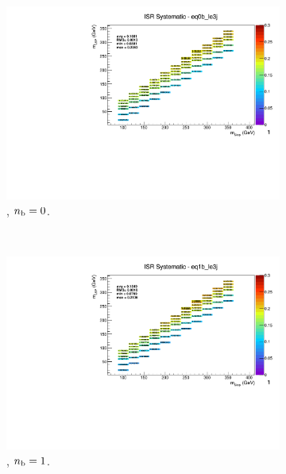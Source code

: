 \begin{figure}[ht!]
  \begin{subfigure}[b]{0.32\textwidth}
    \includegraphics[width=\textwidth, page=1]{Figs/sms/t2cc/v37_2/systs/T2cc_ISR_eq0b_le3j.pdf}
    \caption{\njlow, $n_{\text{b}} = 0$.}
  \end{subfigure}\\
  \begin{subfigure}[b]{0.32\textwidth}
    \includegraphics[width=\textwidth, page=12]{Figs/sms/t2cc/v37_2/systs/T2cc_ISR_eq1b_le3j.pdf}
    \caption{\njlow, $n_{\text{b}} = 1$.}
  \end{subfigure}
  \begin{subfigure}[b]{0.32\textwidth}

\end{subfigure}
\end{figure}
